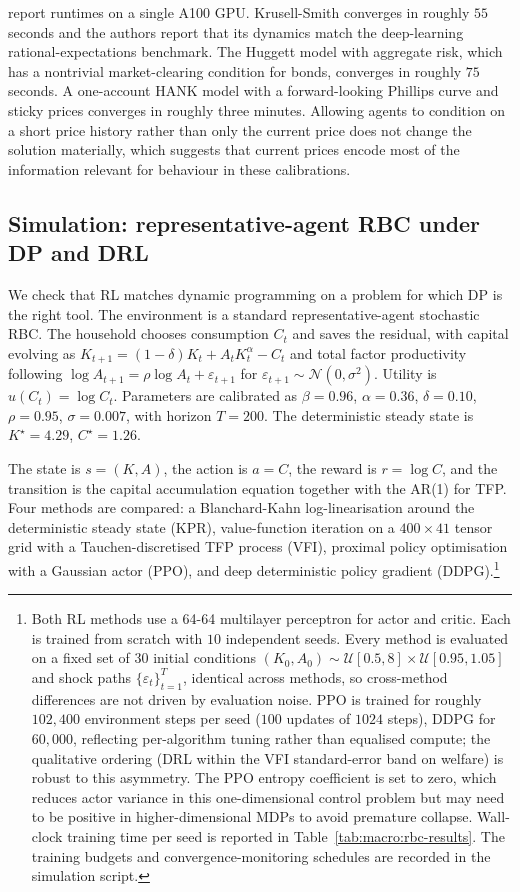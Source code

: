 \citet{Yang2025srl} report runtimes on a single A100 GPU. Krusell-Smith
converges in roughly $55$ seconds and the authors report that its
dynamics match the deep-learning rational-expectations benchmark.
The Huggett model with aggregate risk, which has a nontrivial
market-clearing condition for bonds, converges in roughly $75$
seconds. A one-account HANK model with a forward-looking Phillips
curve and sticky prices converges in roughly three
minutes. Allowing agents to condition on a short price history rather
than only the current price does not change the solution materially,
which suggests that current prices encode most of the information
relevant for behaviour in these calibrations.

\subsection{Simulation: representative-agent RBC under DP and DRL}
\label{sec:macro:simulation}

We check that RL matches dynamic programming on a problem for which
DP is the right tool. The
environment is a standard representative-agent stochastic RBC. The
household chooses consumption $C_t$ and saves the residual, with
capital evolving as $K_{t+1} = (1-\delta) K_t + A_t K_t^\alpha - C_t$
and total factor productivity following $\log A_{t+1} = \rho \log A_t
+ \varepsilon_{t+1}$ for $\varepsilon_{t+1} \sim \mathcal{N}(0,
\sigma^2)$. Utility is $u(C_t) = \log C_t$. Parameters are calibrated
as $\beta = 0.96$, $\alpha = 0.36$, $\delta = 0.10$, $\rho = 0.95$,
$\sigma = 0.007$, with horizon $T = 200$. The deterministic steady
state is $K^\star = 4.29$, $C^\star = 1.26$.

The state is $s = (K, A)$, the action
is $a = C$, the reward is $r = \log C$, and the transition is the
capital accumulation equation together with the AR(1) for TFP. Four
methods are compared: a Blanchard-Kahn log-linearisation around the
deterministic steady state (KPR), value-function iteration on a
$400 \times 41$ tensor grid with a Tauchen-discretised TFP process
(VFI), proximal policy optimisation with a Gaussian actor (PPO), and
deep deterministic policy gradient (DDPG).\footnote{Both RL methods
use a 64-64 multilayer perceptron for actor and critic. Each is
trained from scratch with $10$ independent seeds. Every method is
evaluated on a fixed set of $30$ initial conditions $(K_0, A_0) \sim
\mathcal{U}[0.5, 8] \times \mathcal{U}[0.95, 1.05]$ and shock paths
$\{\varepsilon_t\}_{t=1}^T$, identical across methods, so cross-method
differences are not driven by evaluation noise. PPO is trained for
roughly $102{,}400$ environment steps per seed ($100$ updates of
$1024$ steps), DDPG for $60{,}000$, reflecting per-algorithm tuning
rather than equalised compute; the qualitative ordering (DRL within
the VFI standard-error band on welfare) is robust to this asymmetry.
The PPO entropy coefficient is set to zero, which reduces actor
variance in this one-dimensional control problem but may need to be
positive in higher-dimensional MDPs to avoid premature collapse.
Wall-clock training time per seed is reported in
Table~\ref{tab:macro:rbc-results}. The training budgets and
convergence-monitoring schedules are recorded in the simulation
script.}


